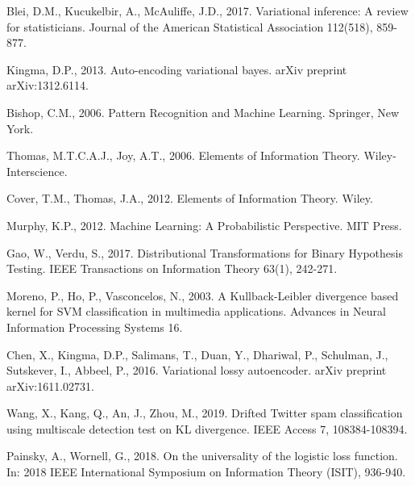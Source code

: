 \documentclass[preprint,12pt]{elsarticle}
\begin{document}

% 
\begin{thebibliography}{99}

Blei, D.M., Kucukelbir, A., McAuliffe, J.D., 2017. Variational inference: A review for statisticians. Journal of the American Statistical Association 112(518), 859-877.

Kingma, D.P., 2013. Auto-encoding variational bayes. arXiv preprint arXiv:1312.6114.

Bishop, C.M., 2006. Pattern Recognition and Machine Learning. Springer, New York.

Thomas, M.T.C.A.J., Joy, A.T., 2006. Elements of Information Theory. Wiley-Interscience.

Cover, T.M., Thomas, J.A., 2012. Elements of Information Theory. Wiley.

Murphy, K.P., 2012. Machine Learning: A Probabilistic Perspective. MIT Press.

Gao, W., Verdu, S., 2017. Distributional Transformations for Binary Hypothesis Testing. IEEE Transactions on Information Theory 63(1), 242-271.

Moreno, P., Ho, P., Vasconcelos, N., 2003. A Kullback-Leibler divergence based kernel for SVM classification in multimedia applications. Advances in Neural Information Processing Systems 16.

Chen, X., Kingma, D.P., Salimans, T., Duan, Y., Dhariwal, P., Schulman, J., Sutskever, I., Abbeel, P., 2016. Variational lossy autoencoder. arXiv preprint arXiv:1611.02731.

Wang, X., Kang, Q., An, J., Zhou, M., 2019. Drifted Twitter spam classification using multiscale detection test on KL divergence. IEEE Access 7, 108384-108394.

Painsky, A., Wornell, G., 2018. On the universality of the logistic loss function. In: 2018 IEEE International Symposium on Information Theory (ISIT), 936-940.

\end{thebibliography}
\end{document}
